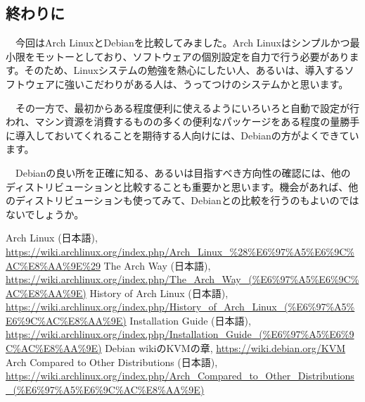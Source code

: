 \documentclass[mingoth,a4paper]{jsarticle}
\begin{document}
\subsection{終わりに}

　今回はArch LinuxとDebianを比較してみました。Arch Linuxはシンプルかつ最小限をモットーとしており、ソフトウェアの個別設定を自力で行う必要があります。そのため、Linuxシステムの勉強を熱心にしたい人、あるいは、導入するソフトウェアに強いこだわりがある人は、うってつけのシステムかと思います。

　その一方で、最初からある程度便利に使えるようにいろいろと自動で設定が行われ、マシン資源を消費するものの多くの便利なパッケージをある程度の量勝手に導入しておいてくれることを期待する人向けには、Debianの方がよくできています。

　Debianの良い所を正確に知る、あるいは目指すべき方向性の確認には、他のディストリビューションと比較することも重要かと思います。機会があれば、他のディストリビューションも使ってみて、Debianとの比較を行うのもよいのではないでしょうか。

\begin{thebibliography}{9}
 Arch Linux (日本語), \url{https://wiki.archlinux.org/index.php/Arch_Linux_%28%E6%97%A5%E6%9C%AC%E8%AA%9E%29}
 The Arch Way (日本語), \url{https://wiki.archlinux.org/index.php/The_Arch_Way_(%E6%97%A5%E6%9C%AC%E8%AA%9E)}
 History of Arch Linux (日本語), \url{https://wiki.archlinux.org/index.php/History_of_Arch_Linux_(%E6%97%A5%E6%9C%AC%E8%AA%9E)}
Installation Guide (日本語), \url{https://wiki.archlinux.org/index.php/Installation_Guide_(%E6%97%A5%E6%9C%AC%E8%AA%9E)}
 Debian wikiのKVMの章, \url{https://wiki.debian.org/KVM}
 Arch Compared to Other Distributions (日本語), \url{https://wiki.archlinux.org/index.php/Arch_Compared_to_Other_Distributions_(%E6%97%A5%E6%9C%AC%E8%AA%9E)}
\end{thebibliography}


\end{document}
